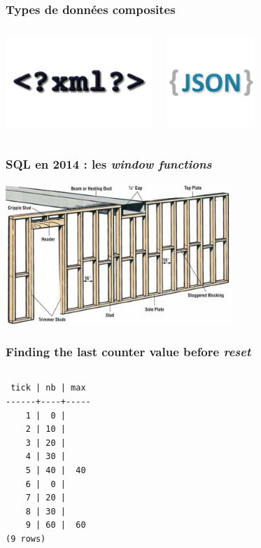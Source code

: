 \documentclass{beamer}
\begin{document}
\begin{frame}
  \frametitle{Types de données composites}

  \begin{columns}[c]
    \begin{center}
      \includegraphics[height=9em]{xml.png}
    \end{center}
    \begin{center}
      \includegraphics[height=9em]{logo-json.png}
    \end{center}
  \end{columns}
\end{frame}

\begin{frame}
  \frametitle{SQL en 2014 : les \textit{window functions}}

  \begin{center}
    \includegraphics[height=2.1in]{how-to-frame-a-partition-1.jpg}
  \end{center}
\end{frame}

\begin{frame}[fragile]
  \frametitle{Finding the last counter value before \textit{reset}}

\begin{columns}
\begin{verbatim}
 tick | nb | max 
------+----+-----
    1 |  0 |    
    2 | 10 |    
    3 | 20 |    
    4 | 30 |    
    5 | 40 |  40
    6 |  0 |    
    7 | 20 |    
    8 | 30 |    
    9 | 60 |  60
(9 rows)
\end{verbatim}
\end{columns}
\end{frame}
\end{document}
